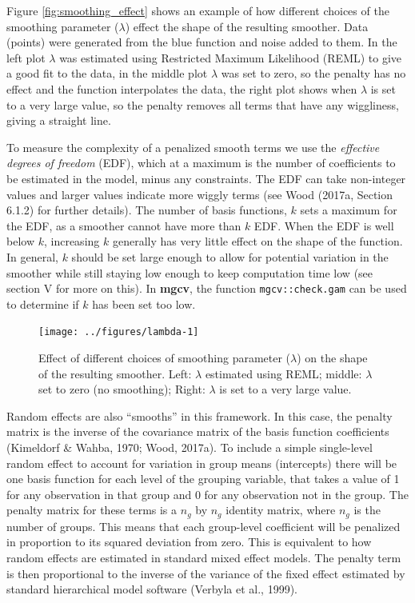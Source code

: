 \documentclass[12pt]{article}
\begin{document}
Figure \ref{fig:smoothing_effect} shows an example of how different
choices of the smoothing parameter (\(\lambda\)) effect the shape of the
resulting smoother. Data (points) were generated from the blue function
and noise added to them. In the left plot \(\lambda\) was estimated
using Restricted Maximum Likelihood (REML) to give a good fit to the
data, in the middle plot \(\lambda\) was set to zero, so the penalty has
no effect and the function interpolates the data, the right plot shows
when \(\lambda\) is set to a very large value, so the penalty removes
all terms that have any wiggliness, giving a straight line.

To measure the complexity of a penalized smooth terms we use the
\emph{effective degrees of freedom} (EDF), which at a maximum is the
number of coefficients to be estimated in the model, minus any
constraints. The EDF can take non-integer values and larger values
indicate more wiggly terms (see Wood (2017a, Section 6.1.2) for further
details). The number of basis functions, \(k\) sets a maximum for the
EDF, as a smoother cannot have more than \(k\) EDF. When the EDF is well
below \(k\), increasing \(k\) generally has very little effect on the
shape of the function. In general, \(k\) should be set large enough to
allow for potential variation in the smoother while still staying low
enough to keep computation time low (see section V for more on this). In
\textbf{mgcv}, the function \texttt{mgcv::check.gam} can be used to
determine if \(k\) has been set too low.

\begin{figure}
\texttt{[image: ../figures/lambda-1]} \caption{\label{fig:smoothing_effect}Effect of different choices of smoothing parameter ($\lambda$) on the shape of the resulting smoother. Left:  $\lambda$ estimated using REML; middle: $\lambda$ set to zero (no smoothing); Right: $\lambda$ is set to a very large value.}\label{fig:lambda}
\end{figure}

Random effects are also ``smooths'' in this framework. In this case, the
penalty matrix is the inverse of the covariance matrix of the basis
function coefficients (Kimeldorf \& Wahba, 1970; Wood, 2017a). To
include a simple single-level random effect to account for variation in
group means (intercepts) there will be one basis function for each level
of the grouping variable, that takes a value of 1 for any observation in
that group and 0 for any observation not in the group. The penalty
matrix for these terms is a \(n_g\) by \(n_g\) identity matrix, where
\(n_g\) is the number of groups. This means that each group-level
coefficient will be penalized in proportion to its squared deviation
from zero. This is equivalent to how random effects are estimated in
standard mixed effect models. The penalty term is then proportional to
the inverse of the variance of the fixed effect estimated by standard
hierarchical model software (Verbyla et al., 1999).
\end{document}

